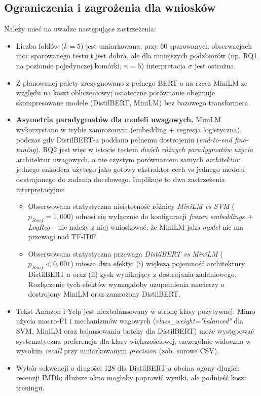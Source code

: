 \documentclass[runningheads]{llncs}
\begin{document}
\subsection*{Ograniczenia i zagrożenia dla wniosków}
Należy mieć na uwadze następujące zastrzeżenia:
\begin{itemize}
    \item Liczba foldów ($k=5$) jest umiarkowana; przy 60 sparowanych obserwacjach moc sparowanego testu t jest dobra, ale dla mniejszych podzbiorów (np. RQ1 na poziomie pojedynczej komórki, $n=5$) interpretacja $\sigma$ jest ostrożna.
    \item Z planowanej palety zrezygnowano z pełnego BERT-a na rzecz MiniLM ze względu na koszt obliczeniowy; ostateczne porównanie obejmuje skompresowane modele (DistilBERT, MiniLM) bez bazowego transformera.
    \item \textbf{Asymetria paradygmatów dla modeli uwagowych.} MiniLM wykorzystano w trybie zamrożonym (embedding + regresja logistyczna), podczas gdy DistilBERT-a poddano pełnemu dostrojeniu (\textit{end-to-end fine-tuning}). RQ2 jest więc w istocie testem \emph{dwóch różnych paradygmatów użycia} architektur uwagowych, a nie czystym porównaniem samych \emph{architektur}: jednego enkodera użytego jako gotowy ekstraktor cech vs jednego modelu dostrajanego do zadania docelowego. Implikuje to dwa zastrzeżenia interpretacyjne:
    \begin{itemize}
        \item Obserwowana statystyczna nieistotność różnicy \emph{MiniLM vs SVM} ($p_{Bonf}=1{,}000$) odnosi się wyłącznie do konfiguracji \textit{frozen embeddings + LogReg} -- nie należy z niej wnioskować, że MiniLM jako \emph{model} nie ma przewagi nad TF-IDF.
        \item Obserwowana statystyczna przewaga \emph{DistilBERT vs MiniLM} ($p_{Bonf}<0{,}001$) miesza dwa efekty: (i) większą pojemność architektury DistilBERT-a oraz (ii) zysk wynikający z dostrajania zadaniowego. Rozłączenie tych efektów wymagałoby uzupełnienia macierzy o dostrojony MiniLM oraz zamrożony DistilBERT.
    \end{itemize}
    \item Tekst Amazon i Yelp jest niezbalansowany w stronę klasy pozytywnej. Mimo użycia macro-F1 i mechanizmów wagowych (\textit{class\_weight="balanced"} dla SVM, MiniLM oraz balansowania batchy dla DistilBERT) może występować systematyczna preferencja dla klasy większościowej, szczególnie widoczna w wysokim \textit{recall} przy umiarkowanym \textit{precision} (zob. surowe CSV).
    \item Wybór sekwencji o długości 128 dla DistilBERT-a obcina ogony długich recenzji IMDb; dłuższe okno mogłoby poprawić wyniki, ale podnieść koszt treningu.
\end{itemize}



\end{document}
